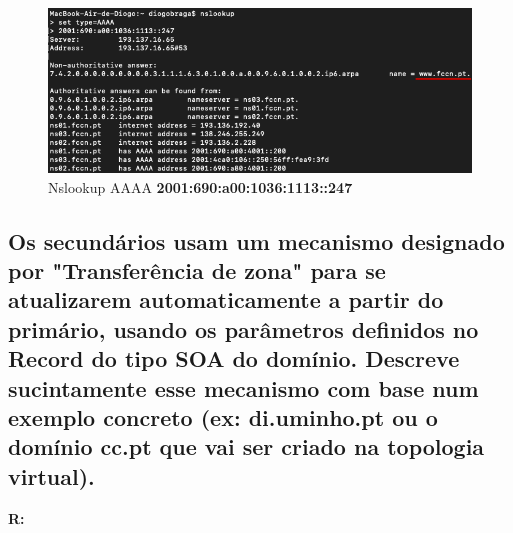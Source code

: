 \documentclass{llncs}
\begin{document}
\begin{figure}[H]
\begin{center}
\includegraphics[scale=0.6]{9.png}
\end{center}
\caption{\label{fig:9}Nslookup AAAA \textbf{2001:690:a00:1036:1113::247}}
\end{figure}


\subsection{\textbf{Os secundários usam um mecanismo designado por "Transferência de zona" para se atualizarem automaticamente a partir do primário, usando os parâmetros definidos no Record do tipo SOA do domínio. Descreve sucintamente esse mecanismo com base num exemplo concreto (ex: di.uminho.pt ou o domínio cc.pt que vai ser criado na topologia virtual).}}
\textbf{R:}
\end{document}
